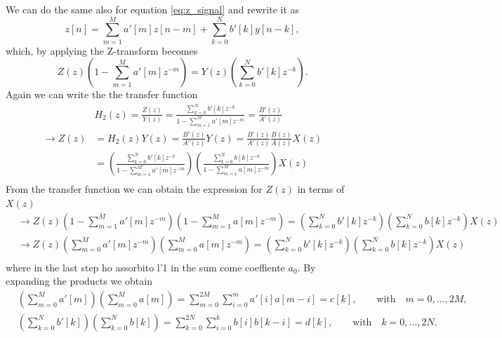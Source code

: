 We can do the same also for equation \ref{eq:z_signal} and rewrite it as 
\begin{equation}\label{eq:z_signal1}
    z[n] = \sum_{m=1}^{M} a'[m]z[n-m] + \sum_{k=0}^{N} b'[k] y[n-k],
\end{equation}
which, by applying the Z-transform becomes
\begin{equation}\label{eq:z_signal_transform}
    Z(z)\left(1 - \sum_{m=1}^{M} a'[m] z^{-m} \right) = Y(z) \left( \sum_{k=0}^{N} b'[k] z^{-k} \right).
\end{equation}
Again we can write the the transfer function
\begin{align}
    &H_2(z) = \frac{Z(z)}{Y(z)} = \frac{\sum_{k=0}^{N} b'[k] z^{-k}}{1 - \sum_{m=1}^{M} a'[m] z^{-m}} = \frac{B'(z)}{A'(z)} \\
    \rightarrow Z(z) &= H_2(z)Y(z) = \frac{B'(z)}{A'(z)}Y(z) = \frac{B'(z)}{A'(z)} \frac{B(z)}{A(z)} X(z)\\ \label{eq:transfer2}
    &= \left( \frac{\sum_{k=0}^{N} b'[k] z^{-k}}{1 - \sum_{m=1}^{M'} a'[m] z^{-m}} \right) \left( \frac{\sum_{k=0}^{N} b[k] z^{-k}}{1 - \sum_{m=1}^{M} a[m] z^{-m}} \right) X(z)\\
\end{align}
From the transfer function we can obtain the expression for $Z(z)$ in terms of $X(z)$ 
\begin{align}
    & \rightarrow Z(z) \left(1 - \sum_{m=1}^{M} a'[m] z^{-m} \right) \left(1 - \sum_{m=1}^{M} a[m] z^{-m} \right) = \left( \sum_{k=0}^{N} b'[k] z^{-k} \right) \left( \sum_{k=0}^{N} b[k] z^{-k} \right) X(z) \\
    & \rightarrow Z(z) \left( \sum_{m=0}^{M} a'[m] z^{-m} \right) \left( \sum_{m=0}^{M} a[m] z^{-m} \right) = \left( \sum_{k=0}^{N} b'[k] z^{-k} \right) \left( \sum_{k=0}^{N} b[k] z^{-k} \right) X(z)\\ \label{eq:Zz}
\end{align}
where in the last step  ho assorbito l'1 in the sum come coeffiente $a_0$. By expanding the products we obtain
\begin{align}
    & \left( \sum_{m=0}^{M} a'[m] \right) \left( \sum_{m=0}^{M} a[m] \right) = \sum_{m=0}^{2M}\sum_{i=0}^{m} a'[i] a[m - i] = c[k], \quad\quad \text{with}\quad m = 0, \dots, 2M,\\ \label{eq:ck}
    & \left( \sum_{k=0}^{N} b'[k] \right) \left( \sum_{k=0}^{N} b[k] \right) = \sum_{k=0}^{2N} \sum_{i=0}^{k} b[i] b[k-i] = d[k], \quad\quad \text{with}\quad k = 0, \dots, 2N.\\ \label{eq:dk}
\end{align}

